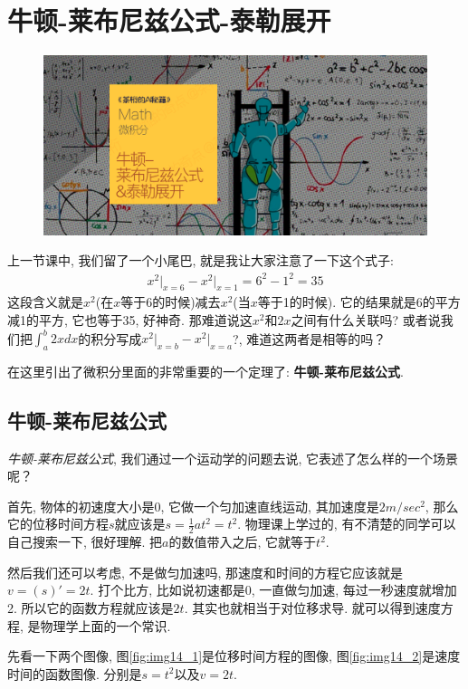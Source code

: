 \chapter{牛顿-莱布尼兹公式-泰勒展开}
\begin{figure}[ht]
  \centering
  \includegraphics[width=1\linewidth]{asset/茶桁的AI秘籍_Math_13.png}
\end{figure}
\newpage

上一节课中, 我们留了一个小尾巴, 就是我让大家注意了一下这个式子: 
\begin{align*}
  x^2\vert _{x=6}-x^2 \vert _{x=1}=6^2 - 1^2 = 35
\end{align*}
这段含义就是$x^2$(在$x$等于6的时候)减去$x^2$(当$x$等于1的时候). 它的结果就是6的平方减1的平方, 它也等于35, 好神奇. 那难道说这$x^2$和$2x$之间有什么关联吗? 或者说我们把$\int_a^b2xdx$的积分写成$x^2\vert_{x=b}-x^2 \vert_{x=a}$?, 难道这两者是相等的吗？

在这里引出了微积分里面的非常重要的一个定理了: \textbf{牛顿-莱布尼兹公式}. 

\section{牛顿-莱布尼兹公式}

\textit{牛顿-莱布尼兹公式}, 我们通过一个运动学的问题去说, 它表述了怎么样的一个场景呢？

首先, 物体的初速度大小是0, 它做一个匀加速直线运动, 其加速度是$2m/sec^2$, 那么它的位移时间方程$s$就应该是$s=\frac{1}{2}at^2 = t^2$. 物理课上学过的, 有不清楚的同学可以自己搜索一下, 很好理解. 把$a$的数值带入之后, 它就等于$t^2$. 

然后我们还可以考虑, 不是做匀加速吗, 那速度和时间的方程它应该就是$ v = (s)' = 2t$. 打个比方, 比如说初速都是0, 一直做匀加速, 每过一秒速度就增加2. 所以它的函数方程就应该是$2t$. 其实也就相当于对位移求导. 就可以得到速度方程, 是物理学上面的一个常识. 

先看一下两个图像, 图\ref{fig:img14_1}是位移时间方程的图像, 图\ref{fig:img14_2}是速度时间的函数图像. 分别是$s=t^2$以及$v=2t$. 

